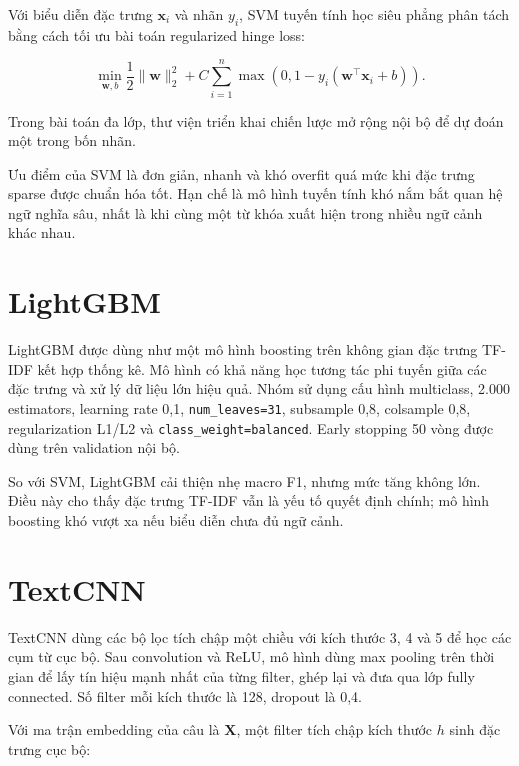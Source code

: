 \documentclass[12pt,a4paper,oneside]{report}
\newlength{\manualparindent}
\newcommand{\manualindent}{\hspace*{\manualparindent}}
\begin{document}
\manualindent%
Với biểu diễn đặc trưng $\mathbf{x}_i$ và nhãn $y_i$, SVM tuyến tính học siêu phẳng phân tách bằng cách tối ưu bài toán regularized hinge loss:

\begin{equation}
  \min_{\mathbf{w},b}
  \frac{1}{2}\|\mathbf{w}\|_2^2
  + C \sum_{i=1}^{n} \max\left(0, 1 - y_i(\mathbf{w}^{\top}\mathbf{x}_i + b)\right).
  \label{eq:svm}
\end{equation}

Trong bài toán đa lớp, thư viện triển khai chiến lược mở rộng nội bộ để dự đoán một trong bốn nhãn.

\manualindent%
Ưu điểm của SVM là đơn giản, nhanh và khó overfit quá mức khi đặc trưng sparse được chuẩn hóa tốt. Hạn chế là mô hình tuyến tính khó nắm bắt quan hệ ngữ nghĩa sâu, nhất là khi cùng một từ khóa xuất hiện trong nhiều ngữ cảnh khác nhau.

\section{LightGBM}

\manualindent%
LightGBM được dùng như một mô hình boosting trên không gian đặc trưng TF-IDF kết hợp thống kê. Mô hình có khả năng học tương tác phi tuyến giữa các đặc trưng và xử lý dữ liệu lớn hiệu quả. Nhóm sử dụng cấu hình multiclass, 2.000 estimators, learning rate 0,1, \texttt{num\_leaves=31}, subsample 0,8, colsample 0,8, regularization L1/L2 và \texttt{class\_weight=balanced}. Early stopping 50 vòng được dùng trên validation nội bộ.

\manualindent%
So với SVM, LightGBM cải thiện nhẹ macro F1, nhưng mức tăng không lớn. Điều này cho thấy đặc trưng TF-IDF vẫn là yếu tố quyết định chính; mô hình boosting khó vượt xa nếu biểu diễn chưa đủ ngữ cảnh.

\section{TextCNN}

\manualindent%
TextCNN dùng các bộ lọc tích chập một chiều với kích thước 3, 4 và 5 để học các cụm từ cục bộ. Sau convolution và ReLU, mô hình dùng max pooling trên thời gian để lấy tín hiệu mạnh nhất của từng filter, ghép lại và đưa qua lớp fully connected. Số filter mỗi kích thước là 128, dropout là 0,4.

\manualindent%
Với ma trận embedding của câu là $\mathbf{X}$, một filter tích chập kích thước $h$ sinh đặc trưng cục bộ:
\end{document}
